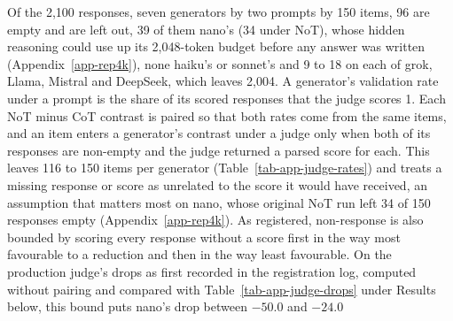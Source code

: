 Of the 2,100 responses, seven generators by two prompts by 150 items, 96 are
empty and are left out, 39 of them nano's (34 under NoT), whose hidden
reasoning could use up its 2,048-token budget before any answer was written
(Appendix~\ref{app-rep4k}), none haiku's or sonnet's and 9 to 18 on each of
grok, Llama, Mistral and DeepSeek, which leaves 2,004.
A generator's validation rate under a prompt is the share of its scored
responses that the judge scores 1. Each NoT minus CoT contrast is paired so
that both rates come from the same items, and an item enters a generator's
contrast under a judge only when both of its responses are non-empty and the
judge returned a parsed score for each. This leaves 116 to 150 items per
generator (Table~\ref{tab-app-judge-rates}) and treats a missing response or
score as unrelated to the score it would have received, an assumption that
matters most on nano, whose original NoT run left 34 of 150 responses empty
(Appendix~\ref{app-rep4k}).
As registered, non-response is also bounded by scoring every response without
a score first in the way most favourable to a reduction and then in the way
least favourable. On the production judge's drops as first recorded in the
registration log, computed without pairing and compared with
Table~\ref{tab-app-judge-drops} under Results below, this bound puts nano's drop between $-50.0$ and $-24.0$

